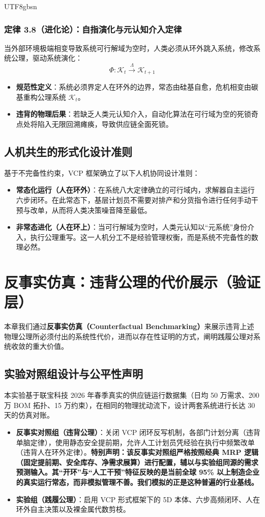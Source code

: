 \documentclass[11pt,a4paper]{article}
\begin{document}
\begin{CJK*}{UTF8}{gbsn}
\subsubsection{定律 3.8（进化论）：自指演化与元认知介入定律}
当外部环境极端相变导致系统可行解域为空时，人类必须从环外跳入系统，修改系统公理，驱动系统演化：
$$\Phi: \mathcal{K}_t \xrightarrow{\Lambda} \mathcal{K}_{t+1}$$
\begin{itemize}
    \item \textbf{规范性定义}：系统必须界定人在环外的边界，常态由硅基自愈，危机相变由碳基重构公理系统 $\mathcal{K}_t$。
    \item \textbf{违背的物理后果}：若缺乏人类元认知介入，自动化算法在可行域为空的死锁奇点处将陷入无限回溯瘫痪，导致供应链全面死锁。
\end{itemize}

\subsection{人机共生的形式化设计准则}
基于不完备性约束，VCP 框架确立了以下人机协同设计准则：
\begin{itemize}
    \item \textbf{常态化运行（人在环外）}：在系统八大定律确立的可行域内，求解器自主运行六步闭环。在此常态下，基层计划员不需要对排产和分货指令进行任何手动干预与改单，从而将人类决策噪音降至最低。
    \item \textbf{非常态进化（人在环上）}：当可行解域为空时，人类元认知以“元系统”身份介入，执行公理重写。这一人机分工不是经验管理权衡，而是系统不完备性的数理必然。
\end{itemize}

\section{反事实仿真：违背公理的代价展示（验证层）}
本章我们通过\textbf{反事实仿真（Counterfactual Benchmarking）}来展示违背上述物理公理所必须付出的系统性代价，进而以存在性证明的方式，阐明践履公理对系统收敛的重大价值。

\subsection{实验对照组设计与公平性声明}
本实验基于联宝科技 2026 年春季真实的供应链运行数据集（日均 50 万需求、200 万 BOM 拓扑、15 万约束），在相同的物理扰动流下，设计两套系统进行长达 30 天的仿真对账。
\begin{itemize}
    \item \textbf{反事实对照组（违背公理）}：关闭 VCP 闭环反写机制，各部门计划分离（违背单脑定律），使用静态安全提前期，允许人工计划员凭经验在执行中频繁改单（违背人在环外定律）。\textbf{特别声明：该反事实对照组严格按照经典 MRP 逻辑（固定提前期、安全库存、净需求展算）进行配置，辅以与实验组同源的需求预测输入。其“开环”与“人工干预”特征反映的是当前全球 95\% 以上制造企业的真实运行常态，而非模拟管理不善。我们模拟的正是这种普遍的行业基线。}
    \item \textbf{实验组（践履公理）}：启用 VCP 形式框架下的 5D 本体、六步高频闭环、人在环外自主决策以及裸金属代数剪枝。
\end{itemize}


\end{CJK*}
\end{document}
